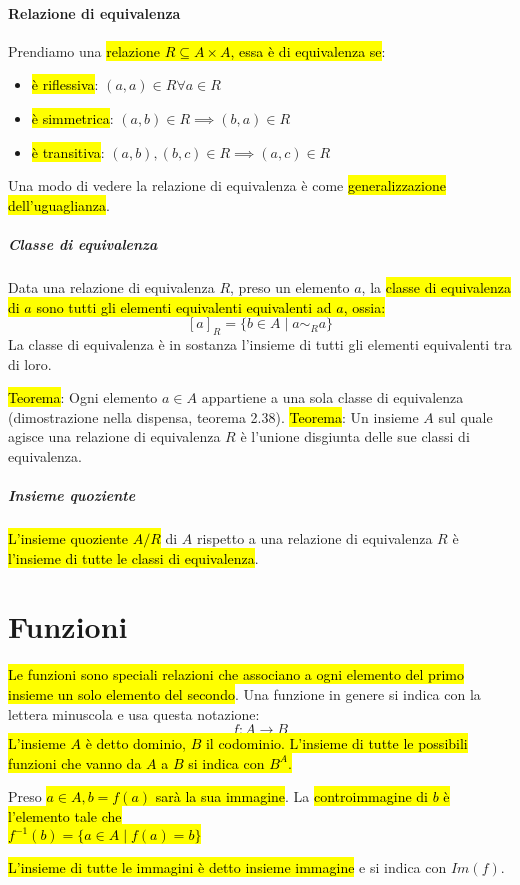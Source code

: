 \paragraph{Relazione di equivalenza} Prendiamo una \hl{relazione
$R \subseteq A \times A$, essa è di equivalenza se}:
\begin{itemize}
    \item \hl{è riflessiva}: $(a,a) \in R \forall a \in R$
    \item \hl{è simmetrica}: $(a,b) \in R \implies (b,a) \in R$
    \item \hl{è transitiva}: $(a,b), (b,c) \in R \implies (a,c) \in R$
\end{itemize}
Una modo di vedere la relazione di equivalenza è come \hl{generalizzazione
dell'uguaglianza}.

\subparagraph{Classe di equivalenza} Data una relazione di equivalenza $R$, preso
un elemento $a$, la \hl{classe di equivalenza di $a$ sono tutti gli elementi
equivalenti equivalenti ad $a$, ossia:}
    \[ {[a]}_R = \{ b \in A \mid a \sim_R a \} \]
La classe di equivalenza è in sostanza l'insieme di tutti gli elementi
equivalenti tra di loro.

\hl{Teorema}: Ogni elemento $a \in A$ appartiene a una sola classe di equivalenza
(dimostrazione nella dispensa, teorema 2.38).
\hl{Teorema}: Un insieme $A$ sul quale agisce una relazione di equivalenza $R$
è l'unione disgiunta delle sue classi di equivalenza.

\subparagraph{Insieme quoziente} \hl{L'insieme quoziente $A/R$} di $A$ rispetto
a una relazione di equivalenza $R$ è \hl{l'insieme di tutte le classi di
equivalenza}.

\section{Funzioni}
\hl{Le funzioni sono speciali relazioni che associano a ogni elemento del
primo insieme un solo elemento del secondo}. Una funzione in genere si indica
con la lettera minuscola e usa questa notazione: \[ f: A \to B \]
\hl{L'insieme $A$ è detto dominio, $B$ il codominio. L'insieme di tutte le
possibili funzioni che vanno da $A$ a $B$ si indica con $B^A$.}

Preso \hl{$a \in A, b = f(a)$ sarà la sua immagine}. La \hl{controimmagine
di $b$ è l'elemento tale che \\ $f^{-1}(b) = \{ a \in A \mid f(a) = b \}$}

\hl{L'insieme di tutte le immagini è detto insieme immagine} e si indica con
$Im(f)$.

